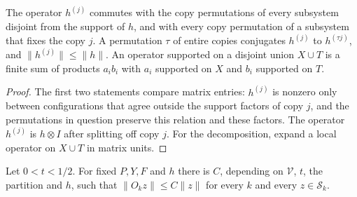 \begin{lemma}
    \label{lem:replica_site_operators}
    \leanok
    The operator $h^{(j)}$ commutes with the copy permutations of every subsystem
    disjoint from the support of $h$, and with every copy permutation of a subsystem
    that fixes the copy $j$. A permutation $\tau$ of entire copies conjugates $h^{(j)}$
    to $h^{(\tau j)}$, and $\|h^{(j)}\|\le\|h\|$. An operator supported on a disjoint
    union $X\cup T$ is a finite sum of products $a_ib_i$ with $a_i$ supported on $X$
    and $b_i$ supported on $T$.
\end{lemma}

\begin{proof}\leanok
    The first two statements compare matrix entries: $h^{(j)}$ is nonzero only
    between configurations that agree outside the support factors of copy $j$, and
    the permutations in question preserve this relation and these factors. The
    operator $h^{(j)}$ is $h\otimes I$ after splitting off copy $j$. For the
    decomposition, expand a local operator on $X\cup T$ in matrix units.
\end{proof}

\begin{theorem}
    \label{thm:marked_similarity_bounded}
    \leanok
    Let $0<t<1/2$. For fixed $P,Y,F$ and $h$ there is $C$, depending on $\mathcal V$, $t$,
    the partition and $h$, such that
    $\|O_kz\|\le C\|z\|$ for every $k$ and every $z\in\mathcal S_k$.
\end{theorem}

